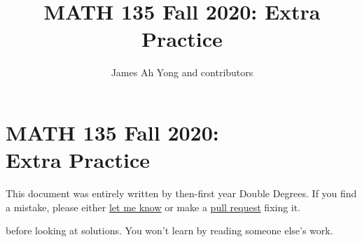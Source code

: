 \documentclass[notes,tikz,minted]{agony}
\title{MATH 135 Fall 2020: Extra Practice}
\author{James Ah Yong and contributors}
\begin{document}
\thispagestyle{firstpage}

\chapter*{MATH 135 Fall 2020:\\{\huge Extra Practice}}

\begin{mdframed}[style=mdround,linecolor=red,backgroundcolor=CarnationPink!5]
  This document was entirely written by then-first year Double Degrees.
  \textbf{\color{Red}{Nothing here is official. There are no guarantees that content is remotely close to correct.}}
  If you find a mistake, please either \href{https://agony.retrocraft.ca/#contact}{let me know}
  or make a \href{https://github.com/RetroCraft/problems/pulls}{pull request} fixing it.

  \textbf{\color{Red}{Try the problems first}} before looking at solutions.
  You won't learn by reading someone else's work.
\end{mdframed}

\begin{multicols*}{2}
  \makeatletter
  \makeatother
\end{multicols*}












\end{document}
